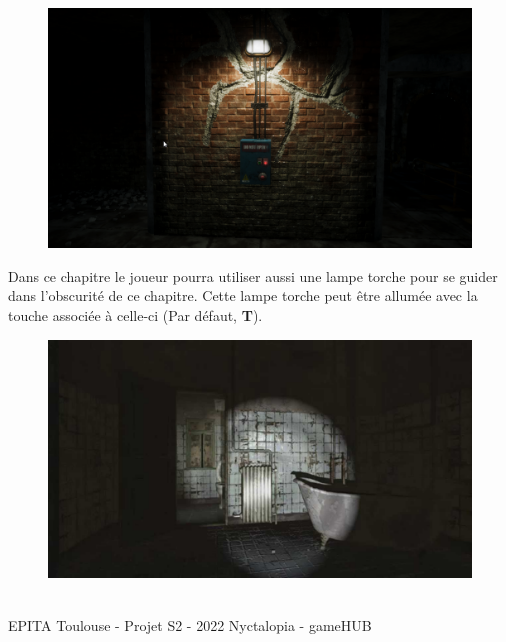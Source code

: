 \begin{figure}[H]
\centering
\begin{minipage}{.5\textwidth}
  \centering
  \centerline{\includegraphics[width=1\linewidth]{img/uwufolder/bornes.png}}
  \label{fig:cinematique}
\end{minipage}%
\end{figure}

Dans ce chapitre le joueur pourra utiliser aussi une lampe torche pour se guider dans l'obscurité de ce chapitre. Cette lampe torche peut être allumée avec la touche associée à celle-ci (Par défaut, \textbf{T}).


\begin{figure}[H]
\centering
\begin{minipage}{.5\textwidth}
  \centering
  \centerline{\includegraphics[width=1\linewidth]{img/egouts/light.jpg}}
  \label{fig:flashlight}
\end{minipage}%
\end{figure}


\vfill
\noindent\makebox[\linewidth]{\rule{.8\paperwidth}{.6pt}}\\[0.2cm]
EPITA Toulouse - Projet S2 - 2022 \hfill Nyctalopia - gameHUB
\noindent\makebox[\linewidth]{\rule{.8\paperwidth}{.6pt}}
\newpage

